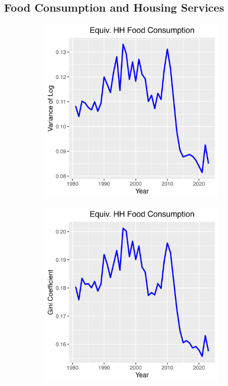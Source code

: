 \documentclass{article}
\begin{document}
\subsection{Food Consumption and Housing Services}

\begin{figure}
    \centering
    \begin{subfigure}[t]{0.475\textwidth}
        \centering
        \includegraphics[width=\textwidth]{figures/Fig_8/Fig_8a_Var_Food.png}
        \label{fig:Food_Var}
    \end{subfigure}
    \begin{subfigure}[t]{0.475\textwidth}
        \centering
        \includegraphics[width=\textwidth]{figures/Fig_8/Fig_8b_Gini_Food.png}

\end{subfigure}
\end{figure}
\end{document}
